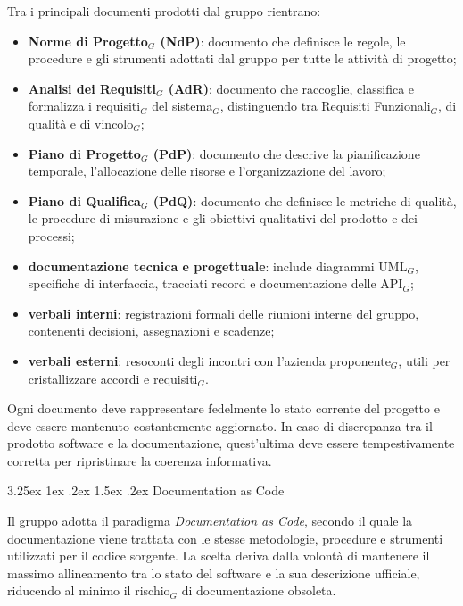 \documentclass[a4paper, 10pt]{article}
\makeatletter
\renewcommand\paragraph{\@startsection{paragraph}{4}{\z@}%
  {3.25ex \@plus1ex \@minus .2ex}%
  {1.5ex \@plus .2ex}%
  {\normalfont\normalsize\bfseries}}
\makeatother
\begin{document}
Tra i principali documenti prodotti dal gruppo rientrano:
\begin{itemize}
    \item \textbf{Norme di Progetto$_G$ (NdP)}: documento che definisce le regole, le procedure e gli strumenti adottati dal gruppo per tutte le attività di progetto;
    \item \textbf{Analisi dei Requisiti$_G$ (AdR)}: documento che raccoglie, classifica e formalizza i requisiti$_G$ del sistema$_G$, distinguendo tra Requisiti Funzionali$_G$, di qualità e di vincolo$_G$;
    \item \textbf{Piano di Progetto$_G$ (PdP)}: documento che descrive la pianificazione temporale, l'allocazione delle risorse e l'organizzazione del lavoro;
    \item \textbf{Piano di Qualifica$_G$ (PdQ)}: documento che definisce le metriche di qualità, le procedure di misurazione e gli obiettivi qualitativi del prodotto e dei processi;
    \item \textbf{documentazione tecnica e progettuale}: include diagrammi UML$_G$, specifiche di interfaccia, tracciati record e documentazione delle API$_G$;
    \item \textbf{verbali interni}: registrazioni formali delle riunioni interne del gruppo, contenenti decisioni, assegnazioni e scadenze;
    \item \textbf{verbali esterni}: resoconti degli incontri con l'azienda proponente$_G$, utili per cristallizzare accordi e requisiti$_G$.
\end{itemize}

Ogni documento deve rappresentare fedelmente lo stato corrente del progetto e deve essere mantenuto costantemente aggiornato. In caso di discrepanza tra il prodotto software e la documentazione, quest'ultima deve essere tempestivamente corretta per ripristinare la coerenza informativa.

\paragraph{Documentation as Code}

Il gruppo adotta il paradigma \textit{Documentation as Code}, secondo il quale la documentazione viene trattata con le stesse metodologie, procedure e strumenti utilizzati per il codice sorgente. La scelta deriva dalla volontà di mantenere il massimo allineamento tra lo stato del software e la sua descrizione ufficiale, riducendo al minimo il rischio$_G$ di documentazione obsoleta.
\end{document}
